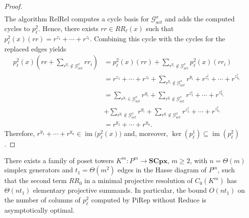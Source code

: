 \documentclass[english,a4paper,nolineno,cleveref]{socg-lipics-v2021}
\DeclareMathOperator{\im}{im}
\begin{document}
\begin{proof}
\begin{equation*}
\begin{aligned}
\end{aligned}
\end{equation*}
The algorithm {\sc RelRel} computes a cycle basis for $\mathcal{G}_{act}^x$ and adds the computed cycles to $p_\ell^2$. Hence, there exists $rr\in RR_\ell(x)$ such that $p^2_\ell(x)(rr)=r^{z_1}+\cdots+r^{z_l}$. Combining this cycle with the cycles for the replaced edges yields
\begin{equation*}
\begin{aligned}
p_\ell^2(x)(rr+\sum_{r^{y_i}\notin \mathcal{G}_{act}^x}rr_i)&=p_\ell^2(x)(rr)+\sum_{r^{y_i}\notin \mathcal{G}_{act}^x}p_\ell^2(x)(rr_i)\\&=r^{z_1}+\cdots+r^{z_l}+\sum_{r^{y_i}\notin \mathcal{G}_{act}^x}r^{y_i}+r^{z^i_1}+\cdots+r^{z^i_{k_i}}\\&=\sum_{r^{y_i}\in\mathcal{G}_{act}^x}r^{y_i}+\sum_{r^{y_i}\notin \mathcal{G}_{act}^x}r^{z^i_1}+\cdots+r^{z^i_{k_i}}\\&+\sum_{r^{y_i}\notin \mathcal{G}_{act}^x}r^{y_i}+\sum_{r^{y_i}\notin \mathcal{G}_{act}^x}r^{z^i_1}+\cdots+r^{z^i_{k_i}}\\&=r^{y_1}+\cdots+r^{y_n} .
\end{aligned}
\end{equation*}
Therefore, $r^{y_1}+\cdots+r^{y_n}\in\im \!\big(p_\ell^2(x))$ and, moreover, $\ker(p_\ell^1)\subseteq \im(p_\ell^2)$.
\end{proof}

\begin{proposition} \label{prop:asymptotic_optimality}
There exists a family of poset towers $K^m\colon P^m\rightarrow \mathbf{SCpx}$, $m\geq 2$, with $n=\Theta(m)$ simplex generators and $t_1=\Theta(m^2)$ edges in the Hasse diagram of $P^m$, such that the second term $RR_0$ in a minimal projective resolution of $C_0(K^m)$ has $\Theta(nt_1)$ elementary projective summands. In particular, the bound $O(nt_1)$ on the number of columns of $p_\ell^2$ computed by {\sc PiRep} without {\sc Reduce} is asymptotically optimal.
\end{proposition}
\end{document}

